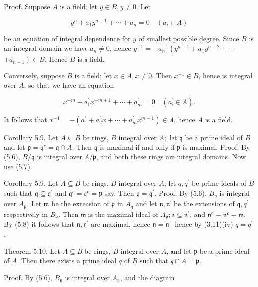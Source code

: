 \documentclass{standalone}
\theoremstyle{definition}
\theoremstyle{remark}
\begin{document}
Proof. Suppose $A$ is a field; let $y \in B, y \neq 0$. Let

\[
y^{n}+a_{1} y^{n-1}+\cdots+a_{n}=0 \quad\left(a_{i} \in A\right)
\]

be an equation of integral dependence for $y$ of smallest possible degree. Since $B$ is an integral domain we have $a_{n} \neq 0$, hence $y^{-1}=-a_{n}^{-1}\left(y^{n-1}+a_{1} y^{n-2}+\cdots\right.$ $\left.+a_{n-1}\right) \in B$. Hence $B$ is a field.

Conversely, suppose $B$ is a field; let $x \in A, x \neq 0$. Then $x^{-1} \in B$, hence is integral over $A$, so that we have an equation

\[
x^{-m}+a_{1}^{\prime} x^{-m+1}+\cdots+a_{m}^{\prime}=0 \quad\left(a_{i}^{\prime} \in A\right) .
\]

It follows that $x^{-1}=-\left(a_{1}^{\prime}+a_{2}^{\prime} x+\cdots+a_{m}^{\prime} x^{m-1}\right) \in A$, hence $A$ is a field.

Corollary 5.9. Let $A \subseteq B$ be rings, $B$ integral over $A ;$ let $\mathfrak{q}$ be a prime ideal of $B$ and let $\mathfrak{p}=\mathfrak{q}^{c}=\mathfrak{q} \cap A$. Then $\mathfrak{q}$ is maximal if and only if $\mathfrak{p}$ is maximal. Proof. By (5.6), $B / \mathfrak{q}$ is integral over $A / \mathfrak{p}$, and both these rings are integral domains. Now use (5.7).

Corollary 5.9. Let $A \subseteq B$ be rings, $B$ integral over $A$; let $q, q^{\prime}$ be prime ideals of $B$ such that $\mathfrak{q} \subseteq \mathfrak{q}^{\prime}$ and $\mathfrak{q}^{c}=\mathfrak{q}^{c}=\mathfrak{p}$ say. Then $\mathfrak{q}=\mathfrak{q}^{\prime}$. Proof. By (5.6), $B_{\mathfrak{y}}$ is integral over $A_{\mathfrak{p}}$. Let $\mathfrak{m}$ be the extension of $\mathfrak{p}$ in $A_{\mathfrak{q}}$ and let $\mathfrak{n}, \mathfrak{n}^{\prime}$ be the extensions of $\mathfrak{q}, q^{\prime}$ respectively in $B_{\mathfrak{p}}$. Then $\mathfrak{m}$ is the maximal ideal of $A_{\mathfrak{p}} ; \mathfrak{n} \subseteq \mathfrak{n}^{\prime}$, and $\mathfrak{n}^{c}=\mathfrak{n}^{\mathfrak{c}}=\mathfrak{m}$. By (5.8) it follows that $\mathfrak{n}, \mathfrak{n}^{\prime}$ are maximal, hence $\mathfrak{n}=\mathfrak{n}^{\prime}$, hence by (3.11)(iv) $q=q^{\prime}$.

Theorem 5.10. Let $A \subseteq B$ be rings, $B$ integral over $A$, and let $\mathfrak{p}$ be a prime ideal of $A$. Then there exists a prime ideal $q$ of $B$ such that $q \cap A=\mathfrak{p}$.

Proof. By (5.6), $B_{\mathfrak{y}}$ is integral over $A_{\mathfrak{y}}$, and the diagram
\end{document}
